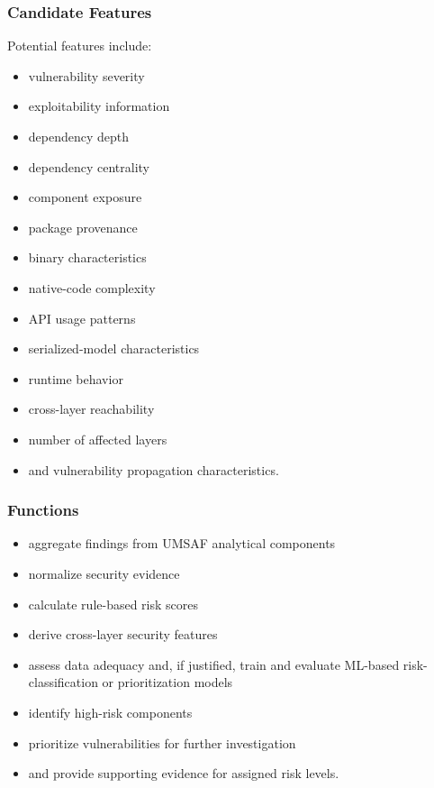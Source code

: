 \documentclass[
  12pt,
  letterpaper,
  oneside]{report}
\providecommand{\tightlist}{%
  \setlength{\itemsep}{0pt}\setlength{\parskip}{0pt}}
\begin{document}
\subsubsection{Candidate Features}\label{candidate-features}

Potential features include:

\begin{itemize}
\tightlist
\item
  vulnerability severity
\item
  exploitability information
\item
  dependency depth
\item
  dependency centrality
\item
  component exposure
\item
  package provenance
\item
  binary characteristics
\item
  native-code complexity
\item
  API usage patterns
\item
  serialized-model characteristics
\item
  runtime behavior
\item
  cross-layer reachability
\item
  number of affected layers
\item
  and vulnerability propagation characteristics.
\end{itemize}

\subsubsection{Functions}\label{functions-7}

\begin{itemize}
\tightlist
\item
  aggregate findings from UMSAF analytical components
\item
  normalize security evidence
\item
  calculate rule-based risk scores
\item
  derive cross-layer security features
\item
  assess data adequacy and, if justified, train and evaluate ML-based
  risk-classification or prioritization models
\item
  identify high-risk components
\item
  prioritize vulnerabilities for further investigation
\item
  and provide supporting evidence for assigned risk levels.
\end{itemize}
\end{document}
